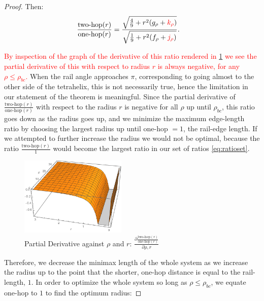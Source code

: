 \documentclass[twocolumn,10pt]{asme2ej}
\newcommand{\highlighttext}[1] {\textcolor{red}{#1}}
\begin{document}
\begin{proof}
Then:
\begin{equation}
  \begin{split}
  \frac{\text{two-hop}(r)}{ \text{one-hop}(r)}  &=
  \frac{\sqrt{\frac{4}{9}  + r^2(g_{\rho}+ \highlighttext{k_{\rho}})}}
       {\sqrt{\frac{1}{9} +r^2(f_{\rho}+\highlighttext{j_{\rho}}) }} \text{.}
  \end{split}       
\end{equation}


\highlighttext{
By inspection of the graph of the derivative of this ratio rendered in \cref{fig:partialderivativediagram} we see the partial derivative of this with respect to
radius $r$ is always negative, for any $\rho \leq \rho_{bc}$.
}
When the rail angle approaches
$\pi$, corresponding to going almost to the other side of the tetrahelix, this is not necessarily true, hence the
limitation in our statement of the theorem is meaningful.
Since the partial derivative of  $\frac{\text{two-hop}(r)}{\text{one-hop}(r)}$ with respect to the
radius $r$ is negative for all $\rho$ up until $\rho_{bc}$, this ratio goes down
as the radius goes up, and 
we minimize the maximum edge-length ratio by choosing the largest radius
up until one-hop $= 1$, the rail-edge length. If we attempted to further increase the radius
we would not be optimal, because the ratio $\frac{\text{two-hop}(r)}{1}$ would become the
largest ratio in our set of ratios \cref{eq:ratioset}.

\begin{figure}
     \centering
     \includegraphics[width=0.45\textwidth]{figures/PartialDerivativeDiagram.png}
     \caption{Partial Derivative against $\rho$ and $r$: $ \frac{\partial \frac{\text{two-hop}(r)}{ \text{one-hop}(r)}}{\partial \rho, r} $ }
  \label{fig:partialderivativediagram}
\end{figure}

Therefore, we decrease the minimax length
of the whole system as we increase the radius
up to the point that the shorter, one-hop distance is equal to the rail-length, $1$.
In order to optimize the whole system so long as $\rho \leq \rho_{bc}$,
we equate one-hop to $1$ to find the optimum radius:



\end{proof}
\end{document}
